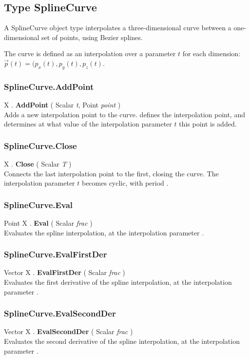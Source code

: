 \subsection{Type SplineCurve \label{T:SplineCurve}}
A SplineCurve object type interpolates a three-dimensional curve between a one-dimensional set of points, using Bezier splines.

The curve is defined as an interpolation over a parameter $t$ for each dimension: $\vec{p}(t)=(p_x(t),p_y(t),p_z(t)$.


\subsubsection{SplineCurve.AddPoint \label{F:SplineCurve:AddPoint}}
X . \textbf{AddPoint} ( Scalar \textit{t}, Point \textit{point} ) \\
Adds a new interpolation point to the curve.  defines the interpolation point, and  determines at what value of the interpolation parameter $t$ this point is added.

\subsubsection{SplineCurve.Close \label{F:SplineCurve:Close}}
X . \textbf{Close} ( Scalar \textit{T} ) \\
Connects the last interpolation point to the first, closing the curve. The interpolation parameter $t$ becomes cyclic, with period .

\subsubsection{SplineCurve.Eval \label{F:SplineCurve:Eval}}
Point X . \textbf{Eval} ( Scalar \textit{frac} ) \\
Evaluates the spline interpolation, at the interpolation parameter .

\subsubsection{SplineCurve.EvalFirstDer \label{F:SplineCurve:EvalFirstDer}}
Vector X . \textbf{EvalFirstDer} ( Scalar \textit{frac} ) \\
Evaluates the first derivative of the spline interpolation, at the interpolation parameter .


\subsubsection{SplineCurve.EvalSecondDer \label{F:SplineCurve:EvalSecondDer}}
Vector X . \textbf{EvalSecondDer} ( Scalar \textit{frac} ) \\
Evaluates the second derivative of the spline interpolation, at the interpolation parameter .

